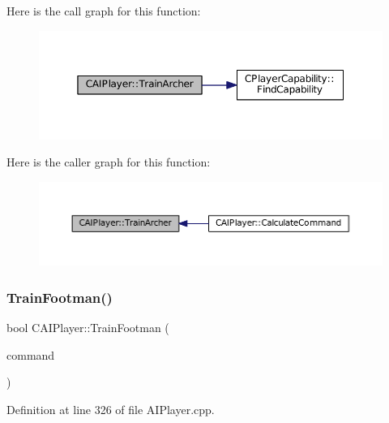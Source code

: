 Here is the call graph for this function\+:\nopagebreak
\begin{figure}[H]
\begin{center}
\leavevmode
\includegraphics[width=350pt]{classCAIPlayer_af2edf1e3c54d6af693f768f86d484fd6_cgraph}
\end{center}
\end{figure}
Here is the caller graph for this function\+:\nopagebreak
\begin{figure}[H]
\begin{center}
\leavevmode
\includegraphics[width=350pt]{classCAIPlayer_af2edf1e3c54d6af693f768f86d484fd6_icgraph}
\end{center}
\end{figure}
\hypertarget{classCAIPlayer_aa3f9c1d0d449a45a24e065d2086527b0}{}\label{classCAIPlayer_aa3f9c1d0d449a45a24e065d2086527b0} 
\subsubsection{\texorpdfstring{Train\+Footman()}{TrainFootman()}}
{\footnotesize\ttfamily bool C\+A\+I\+Player\+::\+Train\+Footman (\begin{DoxyParamCaption}\item[{\hyperlink{structSPlayerCommandRequest}{S\+Player\+Command\+Request} \&}]{command }\end{DoxyParamCaption})\hspace{0.3cm}{\ttfamily [protected]}}



Definition at line 326 of file A\+I\+Player.\+cpp.


